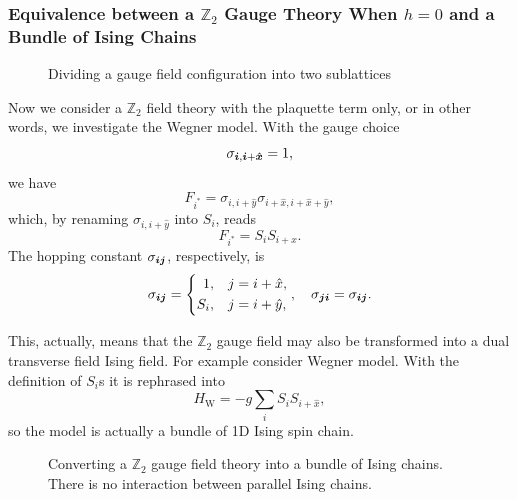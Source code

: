 \documentclass[hyperref, a4paper]{article}
\newcommand*{\Ztwo}{$\mathbb{Z}_2$ }
\begin{document}
\subsubsection{Equivalence between a \Ztwo Gauge Theory When $h = 0$ and a Bundle of Ising Chains}

\begin{figure}
    \centering
    
    \caption{Dividing a gauge field configuration into two sublattices}
\end{figure}

Now we consider a \Ztwo field theory with the plaquette term only, or in other words, we investigate the Wegner model.
With the gauge choice
\begin{equation}
    \sigma_{\vb*{i}, \vb*{i}+\vu*{x}} = 1,
    \label{eq:gauge-choice-x}
\end{equation}
we have
\begin{equation}
    F_{i^*} = \sigma_{i, i+\hat{y}} \sigma_{i+\hat{x}, i + \hat{x} + \hat{y}},
\end{equation}
which, by renaming $\sigma_{i, i+\hat{y}}$ into $S_i$, reads 
\begin{equation}
    F_{i^*} = S_i S_{i+\hat{x}}.
\end{equation}
The hopping constant $\sigma_{\vb*{i} \vb*{j}}$, respectively, is
\begin{equation}
    \sigma_{\vb*{i} \vb*{j}} = \left\{
    \begin{aligned}
        1, &\quad j = i + \hat{x}, \\
        S_i, &\quad j = i + \hat{y},
    \end{aligned}
\right., \quad \sigma_{\vb*{j} \vb*{i}} = \sigma_{\vb*{i} \vb*{j}}.
\end{equation}

This, actually, means that the \Ztwo gauge field may also be transformed into a dual transverse field Ising field.
For example consider Wegner model.
With the definition of $S_i$s it is rephrased into
\begin{equation}
    H_\text{W} = -g \sum_i S_i S_{i+\hat{x}},
\end{equation}
so the model is actually a bundle of 1D Ising spin chain.

\begin{figure}
    \centering
    
    \caption{Converting a \Ztwo gauge field theory into a bundle of Ising chains. There is no interaction between parallel Ising chains.}
\end{figure}
\end{document}
